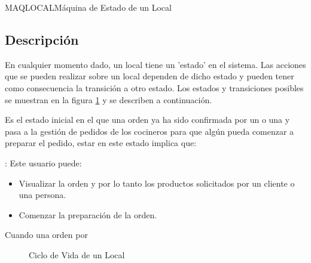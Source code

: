\begin{Maquina}{MAQLOCAL}{Máquina de Estado de un Local}
	\subsection{Descripción}
	En cualquier momento dado, un local tiene un 'estado' en el sistema. Las acciones que se pueden realizar sobre un local dependen de dicho estado y pueden tener como consecuencia la transición a otro estado. Los estados y transiciones posibles se muestran en la figura 	\ref{fig:maqlocal} y se describen a continuación.
			\begin{description}

			\item[Confirmado] Es el estado inicial en el que una orden ya ha sido confirmada por un  o una  y pasa a la gestión de pedidos de los cocineros para que algún  pueda comenzar a preparar el pedido, estar en este estado implica que:
		\item {}: Este usuario puede:
		\begin{itemize}
			\item Visualizar la orden y por lo tanto los productos solicitados por un cliente o una persona. 
			\item Comenzar la preparación de la orden. 
		\end{itemize}
		
			\item[Cancelado] Cuando una orden por 
		\end{description}
	\begin{figure}[hbtp!]
	\begin{center}
		\caption{Ciclo de Vida de un Local}
		\label{fig:maqlocal}
		\end{center}
	\end{figure}

\end{Maquina}



